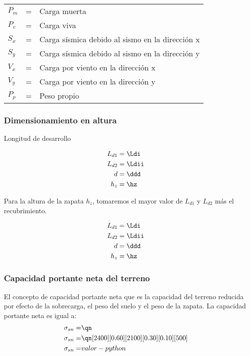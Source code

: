 \begin{table}[h!]
    \centering
    \begin{tabular}{lll}
        $P_m$ &=&   Carga muerta\\
        $P_v$ &=&   Carga viva\\
        $S_x$ &=&   Carga sísmica debido al sismo en la dirección x\\
        $S_y$ &=&   Carga sísmica debido al sismo en la dirección y\\
        $V_x$ &=&   Carga por viento en la dirección x\\
        $V_y$ &=&   Carga por viento en la dirección y\\
        $P_p$ &=&   Peso propio\\
    \end{tabular}
\end{table}

\subsubsection{Dimensionamiento en altura}
Longitud de desarrollo

\begin{align}
	L_{d1} &= \Ldi\\
	L_{d2} &= \Ldii\\
	d      &= \ddd \\
	h_z	   &= \hz
\end{align}

Para la altura de la zapata $h_z$, tomaremos el mayor valor de $L_{d1}$ y $L_{d2}$ más el recubrimiento.

\begin{align*}
    L_{d1} &= \Ldi\\
	L_{d2} &= \Ldii\\
	d      &= \ddd \\
	h_z	   &= \hz
\end{align*}

\subsubsection{Capacidad portante neta del terreno}

El concepto de capacidad portante neta que es la capacidad del terreno reducida por efecto de la sobrecarga, el peso del suelo y el peso de la zapata. La capacidad portante neta es igual a:
\begin{align}
	\sigma_{sn} =&\qn \\
	\sigma_{sn} =&\qn[2400][0.60][2100][0.30][0.10][500]\\
	\sigma_{sn} =& valor-python \nonumber
\end{align}

